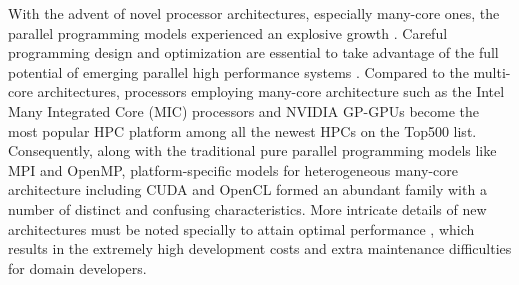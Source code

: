 \documentclass[5p,times]{elsarticle}
\begin{document}
With the advent of novel processor architectures, especially many-core ones, the parallel programming models experienced an explosive growth \cite{b1}. Careful programming design and optimization are essential to take advantage of the full potential of emerging parallel high performance systems \cite{b2}. Compared to the multi-core architectures, processors employing many-core architecture such as the Intel Many Integrated Core (MIC) processors and NVIDIA GP-GPUs become the most popular HPC platform among all the newest HPCs on the Top500 list. Consequently, along with the traditional pure parallel programming models like MPI and OpenMP, platform-specific models for heterogeneous many-core architecture including CUDA and OpenCL formed an abundant family with a number of distinct and confusing characteristics. More intricate details of new architectures must be noted specially to attain optimal performance \cite{b3}, which results in the extremely high development costs and extra maintenance difficulties for domain developers.
\end{document}
